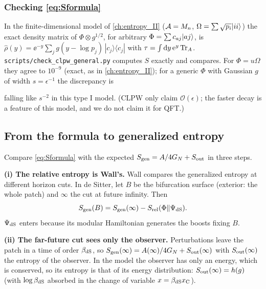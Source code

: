 \subsubsection*{Checking \eqref{eq:Sformula}}
In the finite-dimensional model of \cref{ch:entropy_II} ($\mathcal{A}=M_n$, $\Omega=\sum\sqrt{p_i}\lvert ii\rangle$) the exact density matrix of $\Phi\otimes g^{1/2}$, for arbitrary $\Phi=\sum c_{aj}\lvert aj\rangle$, is $\hat\rho(y)=\ee^{-y}\sum_jg(y-\log p_j)\,|c_j\rangle\langle c_j|$ with $\tau=\int\mathrm{d} y\,\mathrm{e}^{y}\operatorname{Tr}_A$. \texttt{scripts/check\_clpw\_general.py} computes $S$ exactly and compares. For $\Phi=u\Omega$ they agree to $10^{-9}$ (exact, as in \cref{ch:entropy_II}); for a generic $\Phi$ with Gaussian $g$ of width $s=\epsilon^{-1}$ the discrepancy is
\begin{center}
\end{center}
falling like $s^{-2}$ in this type I model. (CLPW only claim $\mathcal O(\epsilon)$; the faster decay is a feature of this model, and we do not claim it for QFT.)

\subsection{From the formula to generalized entropy}

Compare \eqref{eq:Sformula} with the expected $S_{\mathrm{gen}}=A/4G_N+S_{\rm out}$ in three steps.

\textbf{(i) The relative entropy is Wall's.} Wall \cite{Wall2012} compares the generalized entropy at different horizon cuts. In de Sitter, let $B$ be the bifurcation surface (exterior: the whole patch) and $\infty$ the cut at future infinity. Then
\begin{equation}
S_{\mathrm{gen}}(B)=S_{\mathrm{gen}}(\infty)-S_{\rm rel}(\Phi\|\Psi_{\rm dS}).\label{eq:wall}
\end{equation}
$\Psi_{\rm dS}$ enters because its modular Hamiltonian generates the boosts fixing $B$.

\textbf{(ii) The far-future cut sees only the observer.} Perturbations leave the patch in a time of order $\beta_{\rm dS}$, so $S_{\mathrm{gen}}(\infty)=A(\infty)/4G_N+S_{\rm out}(\infty)$ with $S_{\rm out}(\infty)$ the entropy of the observer. In the model the observer has only an energy, which is conserved, so its entropy is that of its energy distribution: $S_{\rm out}(\infty)=h(g)$ (with $\log\beta_{\rm dS}$ absorbed in the change of variable $x=\beta_{\rm dS}x_{\rm C}$).

